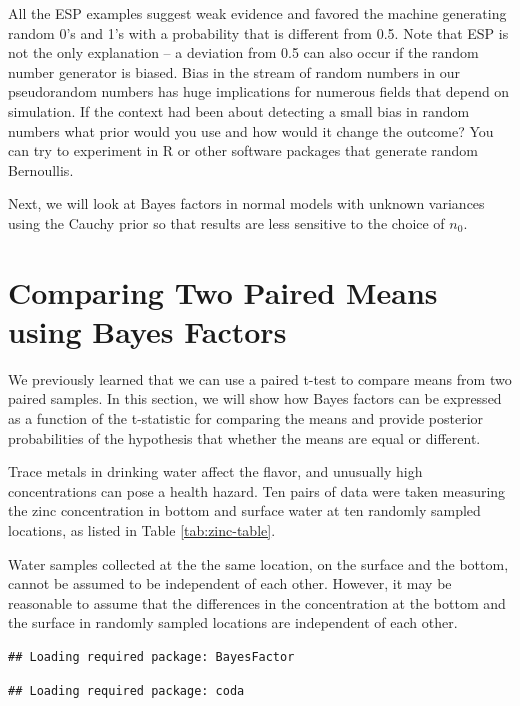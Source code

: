 \documentclass[]{book}
\theoremstyle{definition}
\theoremstyle{definition}
\theoremstyle{definition}
\theoremstyle{remark}
\let\BeginKnitrBlock\begin \let\EndKnitrBlock\end
\begin{document}
All the ESP examples suggest weak evidence and favored the machine
generating random 0's and 1's with a probability that is different from
0.5. Note that ESP is not the only explanation -- a deviation from 0.5
can also occur if the random number generator is biased. Bias in the
stream of random numbers in our pseudorandom numbers has huge
implications for numerous fields that depend on simulation. If the
context had been about detecting a small bias in random numbers what
prior would you use and how would it change the outcome? You can try to
experiment in R or other software packages that generate random
Bernoullis.

Next, we will look at Bayes factors in normal models with unknown
variances using the Cauchy prior so that results are less sensitive to
the choice of \(n_0\).

\section{Comparing Two Paired Means using Bayes
Factors}\label{comparing-two-paired-means-using-bayes-factors}

We previously learned that we can use a paired t-test to compare means
from two paired samples. In this section, we will show how Bayes factors
can be expressed as a function of the t-statistic for comparing the
means and provide posterior probabilities of the hypothesis that whether
the means are equal or different.

\BeginKnitrBlock{example}
\protect\hypertarget{exm:zinc}{}\label{exm:zinc} Trace metals in drinking
water affect the flavor, and unusually high concentrations can pose a
health hazard. Ten pairs of data were taken measuring the zinc
concentration in bottom and surface water at ten randomly sampled
locations, as listed in Table \ref{tab:zinc-table}.

Water samples collected at the the same location, on the surface and the
bottom, cannot be assumed to be independent of each other. However, it
may be reasonable to assume that the differences in the concentration at
the bottom and the surface in randomly sampled locations are independent
of each other.
\EndKnitrBlock{example}

\begin{verbatim}
## Loading required package: BayesFactor
\end{verbatim}

\begin{verbatim}
## Loading required package: coda
\end{verbatim}
\end{document}
